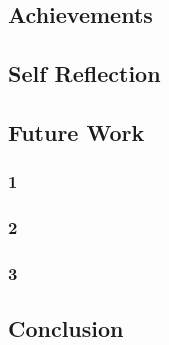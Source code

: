 \documentclass[12pt, letterpaper]{article}
\begin{document}
\subsection{Achievements}
\subsection{Self Reflection}
\subsection{Future Work}
\subsubsection{1}
\subsubsection{2}
\subsubsection{3}
\subsection{Conclusion}
\newpage


\end{document}
